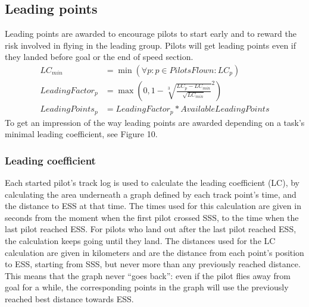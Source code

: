\documentclass{article}
\begin{document}
\subsection{Leading points}
Leading points are awarded to encourage pilots to start early and to reward the risk involved in flying in
the leading group. Pilots will get leading points even if they landed before goal or the end of speed
section.
\begin{align*}
    LC_{min} &= \min(\forall p : p \in PilotsFlown : LC_p) \\
    LeadingFactor_p &= \max(0, 1 - \sqrt[3]{\frac{LC_p - LC_{min}}{\sqrt{LC_{min}}}}^2) \\
    LeadingPoints_p &= LeadingFactor_p * AvailableLeadingPoints
\end{align*}
To get an impression of the way leading points are awarded depending on a task’s minimal leading
coefficient, see Figure 10.

\subsubsection{Leading coefficient}
Each started pilot’s track log is used to calculate the leading coefficient (LC), by calculating the area
underneath a graph defined by each track point’s time, and the distance to ESS at that time. The times
used for this calculation are given in seconds from the moment when the first pilot crossed SSS, to the
time when the last pilot reached ESS. For pilots who land out after the last pilot reached ESS, the
calculation keeps going until they land. The distances used for the LC calculation are given in kilometers
and are the distance from each point’s position to ESS, starting from SSS, but never more than any
previously reached distance. This means that the graph never “goes back”: even if the pilot flies away
from goal for a while, the corresponding points in the graph will use the previously reached best
distance towards ESS.
\end{document}
